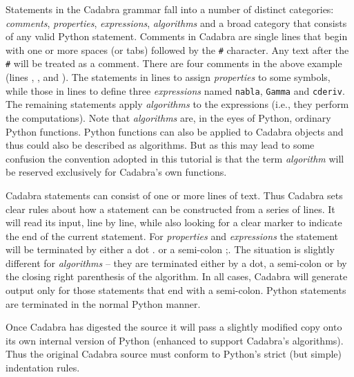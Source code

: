 \documentclass[a4paper,12pt]{article}
\numberwithin{equation}{section}%
\begin{document}
Statements in the Cadabra grammar fall into a number of distinct categories:
\emph{comments}, \emph{properties}, \emph{expressions}, \emph{algorithms} and a broad
category that consists of any valid Python statement. Comments in Cadabra are single lines
that begin with one or more spaces (or tabs) followed by the \verb|#| character. Any text
after the \verb|#| will be treated as a comment. There are four comments in the above
example (lines , ,  and
). The statements in lines  to  assign
\emph{properties} to some symbols, while those in lines  to
 define three \emph{expressions} named \verb|nabla|, \verb|Gamma| and
\verb|cderiv|. The remaining statements apply \emph{algorithms} to the expressions (i.e.,
they perform the computations). Note that \emph{algorithms} are, in the eyes of Python,
ordinary Python functions. Python functions can also be applied to Cadabra objects and thus
could also be described as algorithms. But as this may lead to some confusion the convention
adopted in this tutorial is that the term \emph{algorithm} will be reserved exclusively for
Cadabra's own functions.

Cadabra statements can consist of one or more lines of text. Thus Cadabra sets clear rules
about how a statement can be constructed from a series of lines. It will read its input,
line by line, while also looking for a clear marker to indicate the end of the current
statement. For \emph{properties} and \emph{expressions} the statement will be terminated by
either a dot {\tts .} or a semi-colon {\tts ;}. The situation is slightly different for
\emph{algorithms} -- they are terminated either by a dot, a semi-colon or by the closing
right parenthesis of the algorithm. In all cases, Cadabra will generate output only for
those statements that end with a semi-colon. Python statements are terminated in the normal
Python manner.

Once Cadabra has digested the source it will pass a slightly modified copy onto its own
internal version of Python (enhanced to support Cadabra's algorithms). Thus the original
Cadabra source must conform to Python's strict (but simple) indentation rules.
\end{document}

